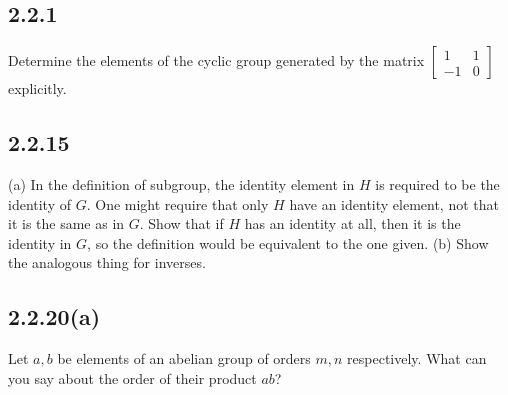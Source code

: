 \documentclass[12pt]{article}
\theoremstyle{definition}
\begin{document}
\subsection*{2.2.1}
Determine the elements of the cyclic group generated by the matrix \(\left[\begin{smallmatrix}
   1 & 1\\
   -1 & 0
\end{smallmatrix}\right]\) explicitly.
\subsection*{2.2.15}
(a) In the definition of subgroup, the identity element in \(H\) is required to be the identity of \(G\).
One might require that only \(H\) have an identity element, not that it is the same as in \(G\).
Show that if \(H\) has an identity at all, then it is the identity in \(G\), so the definition would be
equivalent to the one given.
(b) Show the analogous thing for inverses.
\subsection*{2.2.20(a)}
Let \(a, b\) be elements of an abelian group of orders \(m, n\) respectively. What can you say about the order
of their product \(ab\)?
\end{document}

